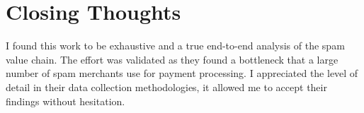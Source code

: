\documentclass[fleqn,11pt]{wlpeerj} %
\begin{document}
\section*{Closing Thoughts}
I found this work to be exhaustive and a true end-to-end analysis of the spam value chain. The effort was validated as they found a bottleneck that a large number of spam merchants use for payment processing. I appreciated the level of detail in their data collection methodologies, it allowed me to accept their findings without hesitation.
\end{document}
